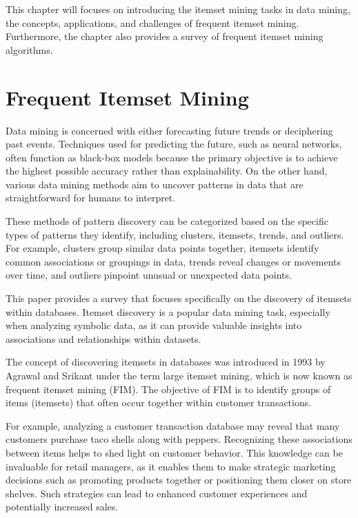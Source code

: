 This chapter will focuses on introducing the itemset mining tasks in data mining, the concepts, applications, and challenges of frequent itemset mining.
Furthermore, the chapter also provides a survey of frequent itemset mining algorithms.

\section{Frequent Itemset Mining}

Data mining\cite{survey_itemset_mining} is concerned with either forecasting future trends or deciphering past events. Techniques used for predicting the future, such as neural networks, often function as black-box models because the primary objective is to achieve the highest possible accuracy rather than explainability. On the other hand, various data mining methods aim to uncover patterns in data that are straightforward for humans to interpret.

These methods of pattern discovery can be categorized based on the specific types of patterns they identify, including clusters, itemsets, trends, and outliers. For example, clusters group similar data points together, itemsets identify common associations or groupings in data, trends reveal changes or movements over time, and outliers pinpoint unusual or unexpected data points.

This paper provides a survey that focuses specifically on the discovery of itemsets within databases. Itemset discovery is a popular data mining task, especially when analyzing symbolic data, as it can provide valuable insights into associations and relationships within datasets.

The concept of discovering itemsets in databases was introduced in 1993 by Agrawal and Srikant under the term large itemset mining, which is now known as frequent itemset mining (FIM). The objective of FIM is to identify groups of items (itemsets) that often occur together within customer transactions.

For example, analyzing a customer transaction database may reveal that many customers purchase taco shells along with peppers. Recognizing these associations between items helps to shed light on customer behavior. This knowledge can be invaluable for retail managers, as it enables them to make strategic marketing decisions such as promoting products together or positioning them closer on store shelves. Such strategies can lead to enhanced customer experiences and potentially increased sales.

